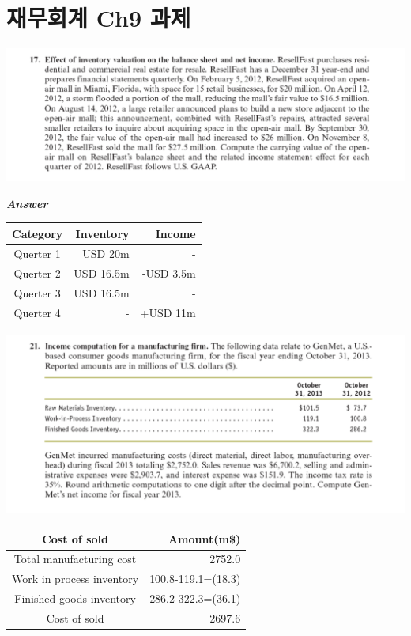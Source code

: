 \documentclass[
  letterpaper,
  DIV=11,
  numbers=noendperiod]{scrreprt}
\begin{document}
\chapter*{재무회계 Ch9
과제}\label{uxc7acuxbb34uxd68cuxacc4-ch9-uxacfcuxc81c}


\includegraphics{images/재무회계9-17.png}

\textbf{\emph{Answer}}

\begin{longtable}[]{@{}crr@{}}
\toprule\noalign{}
Category & Inventory & Income \\
\midrule\noalign{}
\endhead
\bottomrule\noalign{}
\endlastfoot
Querter 1 & USD 20m & - \\
Querter 2 & USD 16.5m & -USD 3.5m \\
Querter 3 & USD 16.5m & - \\
Querter 4 & - & +USD 11m \\
\end{longtable}

\includegraphics{images/재무회계9-21.png}

\begin{longtable}[]{@{}cr@{}}
\toprule\noalign{}
Cost of sold & Amount(m\$) \\
\midrule\noalign{}
\endhead
\bottomrule\noalign{}
\endlastfoot
Total manufacturing cost & 2752.0 \\
Work in process inventory & 100.8-119.1=(18.3) \\
Finished goods inventory & 286.2-322.3=(36.1) \\
Cost of sold & 2697.6 \\
\end{longtable}
\end{document}
